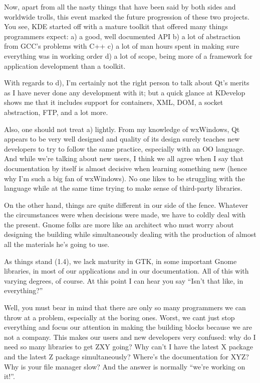 \documentclass{book}
\begin{document}
Now, apart from all the nasty things that have been said by both sides
and worldwide trolls, this event marked the future progression of
these two projects. You see, KDE started off with a mature toolkit
that offered many things programmers expect: a) a good, well
documented API b) a lot of abstraction from GCC's problems
with C++ c) a lot of man hours spent in making sure everything was in
working order d) a lot of scope, being more of a framework for
application development than a toolkit.

With regards to d), I'm certainly not the right person to talk about
Qt's merits as I have never done any development with it; but a quick
glance at KDevelop shows me that it includes support for containers,
XML, DOM, a socket abstraction, FTP, and a lot more.

Also, one should not treat a) lightly. From my knowledge of wxWindows,
Qt appears to be very well designed and quality of its design surely
teaches new developers to try to follow the same practice, especially
with an OO language. And while we're talking about new users, I think
we all agree when I say that documentation by itself is almost
decisive when learning something new (hence why I'm such a big fan of
wxWindows). No one likes to be struggling with the language while at
the same time trying to make sense of third-party libraries.

On the other hand, things are quite different in our side of the
fence. Whatever the circumstances were when decisions were made, we
have to coldly deal with the present. Gnome folks are more like an
architect who must worry about designing the building while
simultaneously dealing with the production of almost all the materials
he's going to use.

As things stand (1.4), we lack maturity in GTK, in some important
Gnome libraries, in most of our applications and in our
documentation. All of this with varying degrees, of course. At this
point I can hear you say ``Isn't that like, in everything?''

Well, you must bear in mind that there are only so many programmers we
can throw at a problem, especially at the boring ones. Worst, we cant
just stop everything and focus our attention in making the building
blocks because we are not a company. This makes our users and new
developers very confused: why do I need so many libraries to get ZXY
going? Why can't I have the latest X package and the latest Z package
simultaneously? Where's the documentation for XYZ? Why is your file
manager slow? And the answer is normally ``we're working on it!''.
\end{document}
